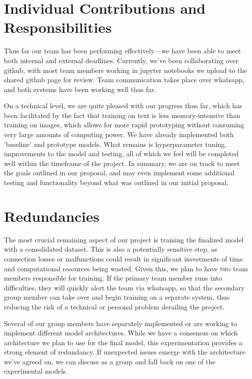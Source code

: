 \documentclass{article} %
\begin{document}
\section{Individual Contributions and Responsibilities}

Thus far our team has been performing effectively—we have been able to meet both internal and external deadlines. Currently, we've been collaborating over github, with most team members working in jupyter notebooks we upload to the shared github page for review. Team communication takes place over whatsapp, and both systems have been working well thus far. 

On a technical level, we are quite pleased with our progress thus far, which has been facilitated by the fact that training on text is less memory-intensive than training on images, which allows for more rapid prototyping without consuming very large amounts of computing power. We have already implemented both 'baseline' and prototype models. What remains is hyperparameter tuning, improvements to the model and testing, all of which we feel will be completed well within the timeframe of the project. In summary, we are on track to meet the goals outlined in our proposal, and may even implement some additional testing and functionality beyond what was outlined in our initial proposal.


\section{Redundancies}

The most crucial remaining aspect of our project is training the finalized model with a consolidated dataset. This is also a potentially sensitive step, as connection losses or malfunctions could result in significant investments of time and computational resources being wasted. Given this, we plan to have two team members responsible for training. If the primary team member runs into difficulties, they will quickly alert the team via whatsapp, so that the secondary group member can take over and begin training on a separate system, thus reducing the risk of a technical or personal problem derailing the project. 

Several of our group members have separately implemented or are working to implement different model architectures. While we have a consensus on which architecture we plan to use for the final model, this experimentation provides a strong element of redundancy. If unexpected issues emerge with the architecture we've agreed on, we can discuss as a group and fall back on one of the experimental models.
\end{document}
